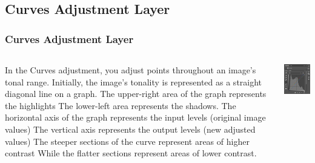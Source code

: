 \documentclass{beamer}
\begin{document}
			\subsection{Curves Adjustment Layer}		
			\begin{frame}
				\frametitle{Curves Adjustment Layer}
				\begin{columns}
					\begin{outline}
						\1 In the Curves adjustment, you adjust points throughout an image’s tonal range.
						\1 Initially, the image’s tonality is represented as a straight diagonal line on a graph.
						\1 The upper-right area of the graph represents the highlights 
						\2 The lower-left area represents the shadows. 
						\2 The horizontal axis of the graph represents the input levels (original image values) 
						\2 The vertical axis represents the output levels (new adjusted values)
						\1 The steeper sections of the curve represent areas of higher contrast 
						\2 While the flatter sections represent areas of lower contrast.
					\end{outline}
					\includegraphics[width=1.0\textwidth]{images/Curves.png}
				\end{columns}
			\end{frame}
			
\end{document}
